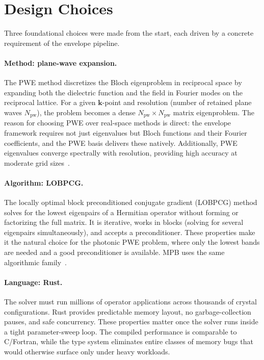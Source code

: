 
\section{Design Choices}\label{sec:design}

Three foundational choices were made from the start, each driven by a
concrete requirement of the envelope pipeline.

\paragraph{Method: plane-wave expansion.}
The PWE method discretizes the Bloch eigenproblem in reciprocal space
by expanding both the dielectric function and the field in Fourier
modes on the reciprocal lattice. For a given $\bm{k}$-point and
resolution (number of retained plane waves $N_{\mathrm{pw}}$), the
problem becomes a dense $N_{\mathrm{pw}} \times N_{\mathrm{pw}}$ matrix
eigenproblem. The reason for choosing PWE over real-space methods is
direct: the envelope framework requires not just eigenvalues but Bloch
functions and their Fourier coefficients, and the PWE basis delivers
these natively. Additionally, PWE eigenvalues converge spectrally with
resolution, providing high accuracy at moderate grid sizes~\cite{mpb}.

\paragraph{Algorithm: LOBPCG.}
The locally optimal block preconditioned conjugate gradient (LOBPCG)
method~\cite{knyazev2001} solves for the lowest eigenpairs of a
Hermitian operator without forming or factorizing the full matrix. It
is iterative, works in blocks (solving for several eigenpairs
simultaneously), and accepts a preconditioner. These properties make it
the natural choice for the photonic PWE problem, where only the lowest
bands are needed and a good preconditioner is available. MPB uses the
same algorithmic family~\cite{mpb}.

\paragraph{Language: Rust.}
The solver must run millions of operator applications across thousands
of crystal configurations. Rust provides predictable memory layout, no
garbage-collection pauses, and safe concurrency. These properties
matter once the solver runs inside a tight parameter-sweep loop. The
compiled performance is comparable to C/Fortran, while the type system
eliminates entire classes of memory bugs that would otherwise surface
only under heavy workloads.

